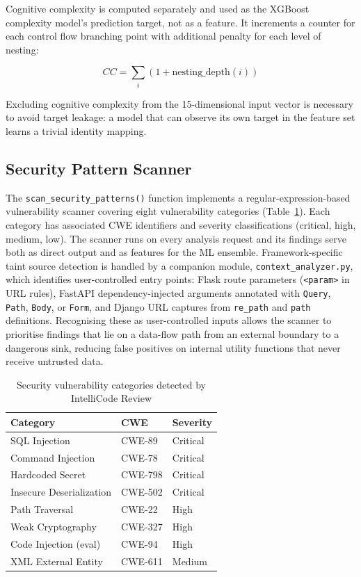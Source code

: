 \documentclass[12pt, oneside]{report}
\begin{document}
Cognitive complexity is computed separately and used as the XGBoost complexity model's
prediction target, not as a feature. It increments a counter for each control flow
branching point with additional penalty for each level of nesting:

\begin{equation}
  CC = \sum_{i} (1 + \text{nesting\_depth}(i)) \label{eq:cogcomplexity}
\end{equation}

Excluding cognitive complexity from the 15-dimensional input vector is necessary to
avoid target leakage: a model that can observe its own target in the feature set
learns a trivial identity mapping.

\subsection{Security Pattern Scanner}

The \texttt{scan\_security\_patterns()} function implements a regular-expression-based
vulnerability scanner covering eight vulnerability categories (Table~\ref{tab:vulntypes}).
Each category has associated CWE identifiers and severity classifications (critical, high,
medium, low). The scanner runs on every analysis request and its findings serve both as
direct output and as features for the ML ensemble. Framework-specific taint source
detection is handled by a companion module, \texttt{context\_analyzer.py}, which
identifies user-controlled entry points: Flask route parameters (\texttt{<param>} in
URL rules), FastAPI dependency-injected arguments annotated with \texttt{Query},
\texttt{Path}, \texttt{Body}, or \texttt{Form}, and Django URL captures from
\texttt{re\_path} and \texttt{path} definitions. Recognising these as user-controlled
inputs allows the scanner to prioritise findings that lie on a data-flow path from
an external boundary to a dangerous sink, reducing false positives on internal
utility functions that never receive untrusted data.

\begin{table}[H]
\centering
\caption{Security vulnerability categories detected by IntelliCode Review}
\label{tab:vulntypes}
\begin{tabular}{@{}lll@{}}
\toprule
\textbf{Category} & \textbf{CWE} & \textbf{Severity} \\
\midrule
SQL Injection           & CWE-89  & Critical \\
Command Injection       & CWE-78  & Critical \\
Hardcoded Secret        & CWE-798 & Critical \\
Insecure Deserialization & CWE-502 & Critical \\
Path Traversal          & CWE-22  & High \\
Weak Cryptography       & CWE-327 & High \\
Code Injection (eval)   & CWE-94  & High \\
XML External Entity     & CWE-611 & Medium \\
\bottomrule
\end{tabular}
\end{table}
\end{document}
